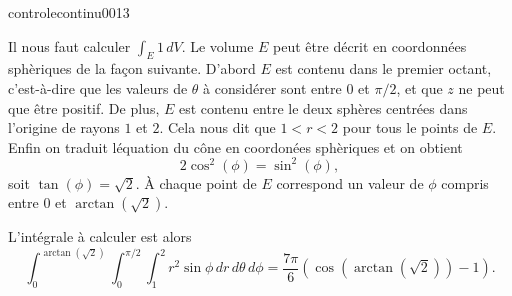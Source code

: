 \begin{corrige}{controlecontinu0013}

Il nous faut calculer $\int_{E}1\,dV$. Le volume $E$ peut être décrit en coordonnées sphèriques de la façon suivante. D'abord $E$ est contenu dans le premier octant, c'est-à-dire que les valeurs de $\theta$ à considérer sont entre $0$ et $\pi/2$, et que $z$ ne peut que être positif. De plus, $E$ est contenu entre le deux sphères centrées dans l'origine de rayons $1$ et $2$. Cela nous dit que $1<r<2$ pour tous le points de $E$. Enfin on traduit léquation du cône en coordonées sphèriques et on obtient
\[
2\cos^2(\phi)= \sin^2(\phi),
\]
soit $\tan(\phi)=\sqrt{2}$. À chaque point de $E$ correspond un valeur de $\phi$ compris entre $0$ et $\arctan(\sqrt{2})$. 

L'intégrale à calculer est alors 
\[
\int_0^{\arctan(\sqrt{2})}\int_0^{\pi/2}\int_{1}^{2} r^2\sin{\phi}\, dr\, d\theta\, d\phi = \frac{7\pi}{6}(\cos(\arctan(\sqrt{2}))-1). 
\]

\end{corrige}
